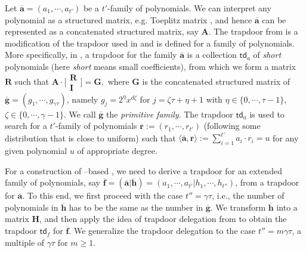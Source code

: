 \documentclass[runningheads]{llncs}
\begin{document}
Let $\overline{\textbf{a}}=(a_1, \cdots, a_{t'})$ be a $t'$-family of polynomials. We can interpret any polynomial as a structured matrix, e.g. Toeplitz matrix \cite{Pan01}, and hence $\overline{\textbf{a}}$ can be represented as a concatenated structured matrix, say $\textbf{A}$. 
The trapdoor from \cite{LVV19} is a modification of the trapdoor used in \cite{MP12} 
and is defined for a family of polynomials.  
More specifically, in \cite{LVV19}, a trapdoor for the  family $\overline{\textbf{a}}$ is a collection $\textsf{td}_a$ of 
\textit{short} polynomials (here \textit{short} means small coefficients), 
from which we form a matrix $\textbf{R}$ such that  $\mathbf{A}\cdot \bigl[ \begin{smallmatrix}
   \mathbf{R}\\ \mathbf{I}
 \end{smallmatrix} \bigr]=\mathbf{G},$ where $\mathbf{G}$ is the concatenated structured matrix of $\overline{\mathbf{g}}=(g_1, \cdots, g_{\gamma \tau})$, namely $g_j=2^\eta x^{d\zeta}$ for $j=\zeta \tau+\eta+1$ with $\eta \in \{0,\cdots, \tau-1\}$, $\zeta \in \{0,\cdots, \gamma-1 \}$. We call $\overline{\mathbf{g}}$ the \textit{primitive family}. 
The trapdoor $\mathsf{td}_a$ is used to search for a $t'$-family of polynomials $\overline{\textbf{r}}:=(r_1, \cdots, r_{t'})$ (following some distribution that is close to uniform) 
such that $\langle \overline{\textbf{a}},\overline{\textbf{r}} \rangle:=\sum_{i=1}^{t'}a_i\cdot r_i=u$ for any given polynomial $u$ of appropriate degree.
 
  For a construction of --based , we need to derive a trapdoor for an extended family of polynomials, say $\overline{\textbf{f}}=(\overline{\textbf{a}}| \overline{\textbf{h}})=(a_1, \cdots, a_{t'}| h_1, \cdots, h_{t''})$, from a trapdoor for $\overline{\textbf{a}}$. 
 To this end, we first proceed with the case $t''=\gamma \tau$, i.e., the number of polynomials in $\overline{\textbf{h}}$ has to be the same as the number in $\overline{\textbf{g}}$.
 We transform $\overline{\textbf{h}}$ into a matrix $\mathbf{H}$, and then apply the idea of trapdoor delegation from \cite{MP12} to obtain the trapdoor $\textsf{td}_f$ for $\overline{\textbf{f}}$. 
 We generalize the trapdoor delegation to the case $t''=m \gamma \tau$, a multiple of $\gamma \tau$ for $m \geq 1$. 
 
\end{document}
